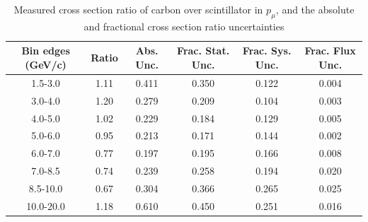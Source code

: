 \documentclass[../main.tex]{subfiles}
\begin{document}
\setlength\tabcolsep{0.5em}
\begin{table}
  \centering
  \renewcommand{\arraystretch}{1.15}
  \caption{Measured cross section ratio of carbon over scintillator in $p_{\mu}$, and the absolute and fractional cross section ratio uncertainties}
    \begin{tabular}{c||c|c||c|c|c}
      Bin edges (GeV/c) &  Ratio  &  Abs. Unc.  &  Frac. Stat. Unc.  &  Frac. Sys. Unc.  &  Frac. Flux Unc. \\
      \hline
      \hline
      1.5-3.0 & 1.11 & 0.411 & 0.350 & 0.122 & 0.004\\
      3.0-4.0 & 1.20 & 0.279 & 0.209 & 0.104 & 0.003\\
      4.0-5.0 & 1.02 & 0.229 & 0.184 & 0.129 & 0.005\\
      5.0-6.0 & 0.95 & 0.213 & 0.171 & 0.144 & 0.002\\
      6.0-7.0 & 0.77 & 0.197 & 0.195 & 0.166 & 0.008\\
      7.0-8.5 & 0.74 & 0.239 & 0.258 & 0.194 & 0.020\\
      8.5-10.0 & 0.67 & 0.304 & 0.366 & 0.265 & 0.025\\
      10.0-20.0 & 1.18 & 0.610 & 0.450 & 0.251 & 0.016
    \end{tabular}
  \label{tbl:rationucleonnuc6muon_pa}
\end{table}
\begin{table}
  \centering
  \renewcommand{\arraystretch}{1.15}
  \caption{Statistical covariance matrix of measured cross section ratio of carbon over scintillator in $p_{\mu}$}
  \label{tbl:rationucleonnuc6muon_pb}
\end{table}
\end{document}
